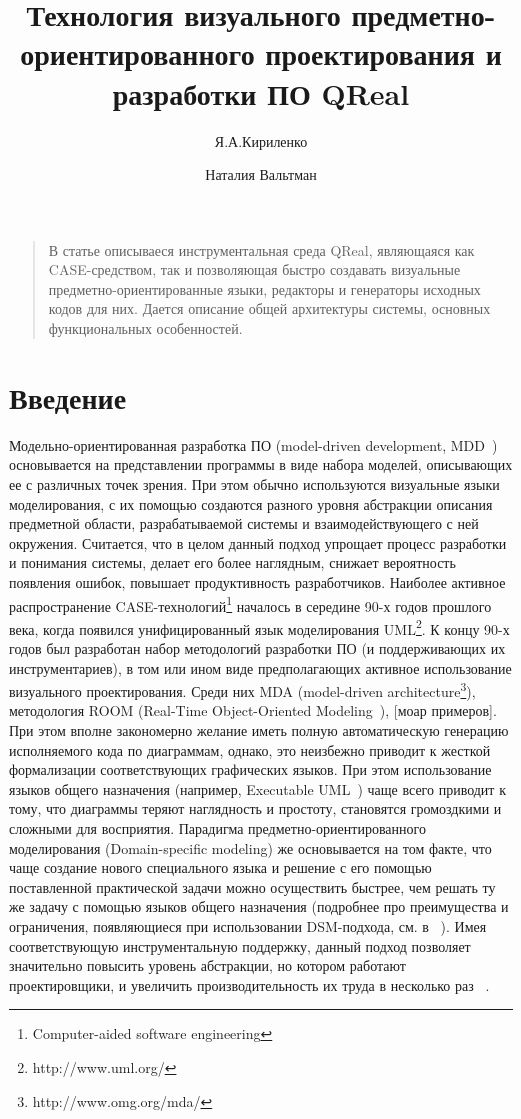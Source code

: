 \documentclass[a4paper]{article}
\title{Технология визуального предметно-ориентированного проектирования и разработки ПО QReal}
\author{Я.А.Кириленко \and Наталия Вальтман}
\date{}
\begin{document}
\maketitle
\thispagestyle{empty}

\begin{quote}
\small\noindent
В статье описываеся инструментальная среда QReal, являющаяся как CASE-средством, так и позволяющая быстро создавать визуальные предметно-ориентированные языки, редакторы и генераторы исходных кодов для них. Дается описание общей архитектуры системы, основных функциональных особенностей. 
\end{quote}

\section*{Введение}

Модельно-ориентированная разработка ПО (model-driven development, MDD~\cite{mdd}) основывается на представлении программы в виде набора моделей, описывающих ее с различных точек зрения. При этом обычно используются визуальные языки моделирования, с их помощью создаются разного уровня абстракции описания предметной области, разрабатываемой системы и взаимодействующего с ней окружения. Считается, что в целом данный подход упрощает процесс разработки и понимания системы, делает его более наглядным, снижает вероятность появления ошибок, повышает продуктивность разработчиков. Наиболее активное распространение CASE-технологий\footnote{Computer-aided software engineering}  началось в середине 90-х годов прошлого века, когда появился унифицированный язык моделирования UML\footnote{http://www.uml.org/}. К концу 90-х годов был разработан набор методологий разработки ПО (и поддерживающих их инструментариев), в том или ином виде предполагающих активное использование визуального проектирования. Среди них MDA (model-driven architecture\footnote{http://www.omg.org/mda/}), методология ROOM (Real-Time Object-Oriented Modeling~\cite{room}), [моар примеров]. При этом вполне закономерно желание иметь полную автоматическую генерацию исполняемого кода по диаграммам, однако, это неизбежно приводит к жесткой формализации соответствующих графических языков. При этом использование языков общего назначения (например, Executable UML~\cite{xuml}) чаще всего приводит к тому, что диаграммы теряют наглядность и простоту, становятся громоздкими и сложными для восприятия. Парадигма предметно-ориентированного моделирования (Domain-specific modeling) же основывается на том факте, что чаще создание нового специального языка и решение с его помощью поставленной практической задачи можно осуществить быстрее, чем решать ту же задачу с помощью языков общего назначения (подробнее про преимущества и ограничения, появляющиеся при использовании DSM-подхода, см. в ~\cite{theBook}). Имея соответствующую инструментальную поддержку, данный подход позволяет значительно повысить уровень абстракции, но котором работают проектировщики, и увеличить производительность их труда в несколько раз ~\cite{dsm01, dsm02, dsm03}.
\end{document}
